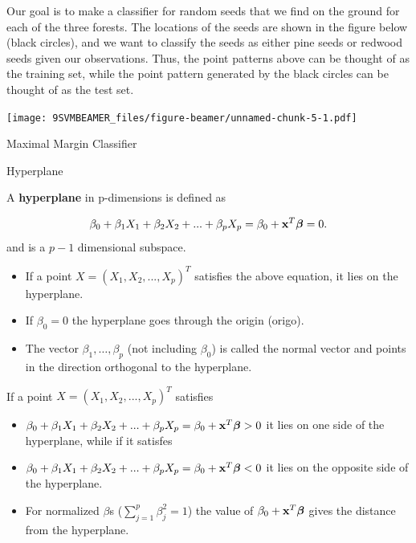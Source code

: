 \documentclass[ignorenonframetext,]{beamer}
\providecommand{\tightlist}{%
  \setlength{\itemsep}{0pt}\setlength{\parskip}{0pt}}
\begin{document}
\begin{frame}

Our goal is to make a classifier for random seeds that we find on the
ground for each of the three forests. The locations of the seeds are
shown in the figure below (black circles), and we want to classify the
seeds as either pine seeds or redwood seeds given our observations.
Thus, the point patterns above can be thought of as the training set,
while the point pattern generated by the black circles can be thought of
as the test set.

\end{frame}

\begin{frame}

\texttt{[image: 9SVMBEAMER\_files/figure-beamer/unnamed-chunk-5-1.pdf]}

\end{frame}

\begin{frame}{Maximal Margin Classifier}

\begin{block}{Hyperplane}

A \textbf{hyperplane} in p-dimensions is defined as

\[\beta_0+\beta_1 X_1 + \beta_2 X_2 +...+\beta_p X_p=\beta_0+{\bf x}^T {\boldsymbol \beta}=0.\]
and is a \(p-1\) dimensional subspace.

\begin{itemize}
\tightlist
\item
  If a point \(X=(X_1,X_2,...,X_p)^T\) satisfies the above equation, it
  lies on the hyperplane.
\item
  If \(\beta_0=0\) the hyperplane goes through the origin (origo).
\item
  The vector \(\beta_1, \ldots, \beta_p\) (not including \(\beta_0\)) is
  called the normal vector and points in the direction orthogonal to the
  hyperplane.
\end{itemize}

\end{block}

\end{frame}

\begin{frame}

If a point \(X=(X_1,X_2,...,X_p)^T\) satisfies

\begin{itemize}
\tightlist
\item
  \(\beta_0+\beta_1 X_1 + \beta_2 X_2 +...+\beta_p X_p=\beta_0+{\bf x}^T {\boldsymbol \beta}>0\)
  it lies on one side of the hyperplane, while if it satisfes
\item
  \(\beta_0+\beta_1 X_1 + \beta_2 X_2 +...+\beta_p X_p=\beta_0+{\bf x}^T {\boldsymbol \beta}<0\)
  it lies on the opposite side of the hyperplane.
\item
  For normalized \(\beta\)s (\(\sum_{j=1}^p \beta_j^2=1\)) the value of
  \(\beta_0+{\bf x}^T{\boldsymbol \beta}\) gives the distance from the
  hyperplane.
\end{itemize}

\end{frame}
\end{document}
